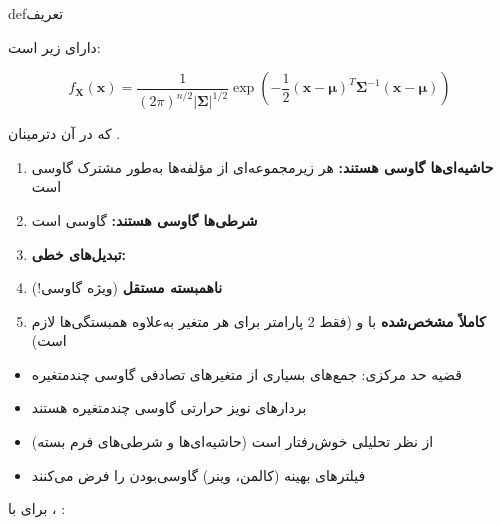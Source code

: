 
\begin{PSbox}[unbreakable]{def}{تعریف}

 دارای  زیر است:

\[f_\mathbf{X}(\mathbf{x}) = \frac{1}{(2\pi)^{n/2}|\boldsymbol{\Sigma}|^{1/2}} \exp\left(-\frac{1}{2}(\mathbf{x}-\boldsymbol{\mu})^T \boldsymbol{\Sigma}^{-1}(\mathbf{x}-\boldsymbol{\mu})\right)\]

که در آن \lr{\textbar{}\ensuremath{\Sigma}\textbar{} =} دترمینان \lr{\ensuremath{\Sigma}}.

\end{PSbox}


\begin{enumerate}
\def\labelenumi{\arabic{enumi}.}
\tightlist
\item
  \textbf{حاشیه‌ای‌ها گاوسی هستند:} هر زیرمجموعه‌ای از مؤلفه‌ها به‌طور مشترک گاوسی است
\item
  \textbf{شرطی‌ها گاوسی هستند:}  گاوسی است
\item
  \textbf{تبدیل‌های خطی:} 
\item
  \textbf{ناهمبسته \lr{=} مستقل} (ویژه گاوسی!)
\item
  \textbf{کاملاً مشخص‌شده} با \lr{\ensuremath{\mu}} و \lr{\ensuremath{\Sigma}} (فقط 2 پارامتر برای هر متغیر به‌علاوه همبستگی‌ها لازم است)
\end{enumerate}


\begin{itemize}
\tightlist
\item
  قضیه حد مرکزی: جمع‌های بسیاری از متغیرهای تصادفی \lr{\ensuremath{\to}} گاوسی چندمتغیره
\item
  بردارهای نویز حرارتی گاوسی چندمتغیره هستند
\item
  از نظر تحلیلی خوش‌رفتار است (حاشیه‌ای‌ها و شرطی‌های فرم بسته)
\item
  فیلترهای بهینه (کالمن، وینر) گاوسی‌بودن را فرض می‌کنند
\end{itemize}


برای  با ، :

